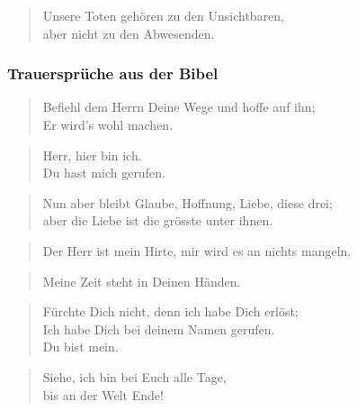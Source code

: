 \documentclass[ngerman,a4paper,11pt]{scrreprt}
\begin{document}
\begin{verse}
Unsere Toten gehören zu den Unsichtbaren, \\
aber nicht zu den Abwesenden. \\
\end{verse}

\subsubsection*{Trauersprüche aus der Bibel}
\label{sec-1-1-1-2-5}

\begin{verse}
Befiehl dem Herrn Deine Wege und hoffe auf ihn; \\
Er wird's wohl machen. \\
\end{verse}

\begin{verse}
Herr, hier bin ich. \\
Du hast mich gerufen. \\
\end{verse}

\begin{verse}
Nun aber bleibt Glaube, Hoffnung, Liebe, diese drei; \\
aber die Liebe ist die grösste unter ihnen. \\
\end{verse}

\begin{verse}
Der Herr ist mein Hirte, mir wird es an nichts mangeln. \\
\end{verse}

\begin{verse}
Meine Zeit steht in Deinen Händen. \\
\end{verse}

\begin{verse}
Fürchte Dich nicht, denn ich habe Dich erlöst; \\
Ich habe Dich bei deinem Namen gerufen. \\
Du bist mein. \\
\end{verse}

\begin{verse}
Siehe, ich bin bei Euch alle Tage, \\
bis an der Welt Ende! \\
\end{verse}
\end{document}
